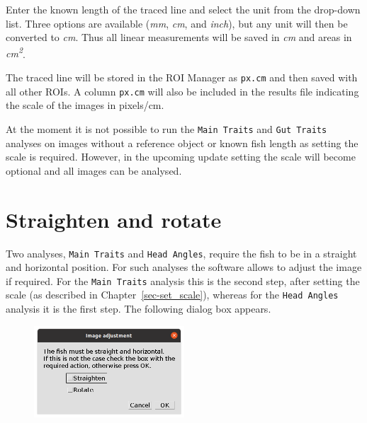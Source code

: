 \documentclass[
  letterpaper,
]{scrbook}
\begin{document}
Enter the known length of the traced line and select the unit from the
drop-down list. Three options are available (\emph{mm}, \emph{cm}, and
\emph{inch}), but any unit will then be converted to \emph{cm}. Thus all
linear measurements will be saved in \emph{cm} and areas in
\emph{cm\textsuperscript{2}}.

The traced line will be stored in the ROI Manager as \texttt{px.cm} and
then saved with all other ROIs. A column \texttt{px.cm} will also be
included in the results file indicating the scale of the images in
pixels/cm.

\begin{tcolorbox}[standard jigsaw,bottomtitle=1mm, toptitle=1mm, colframe=quarto-callout-warning-color-frame, colbacktitle=quarto-callout-warning-color!10!white, title=\textcolor{quarto-callout-warning-color}{\faExclamationTriangle}\hspace{0.5em}{Warning}, titlerule=0mm, opacityback=0, arc=.35mm, opacitybacktitle=0.6, rightrule=.15mm, toprule=.15mm, coltitle=black, left=2mm, colback=white, leftrule=.75mm, bottomrule=.15mm]
At the moment it is not possible to run the \texttt{Main\ Traits} and
\texttt{Gut\ Traits} analyses on images without a reference object or
known fish length as setting the scale is required. However, in the
upcoming update setting the scale will become optional and all images
can be analysed.
\end{tcolorbox}

\hypertarget{sec-straighten_rotate}{%
\chapter{Straighten and rotate}\label{sec-straighten_rotate}}

Two analyses, \texttt{Main\ Traits} and \texttt{Head\ Angles}, require
the fish to be in a straight and horizontal position. For such analyses
the software allows to adjust the image if required. For the
\texttt{Main\ Traits} analysis this is the second step, after setting
the scale (as described in Chapter~\ref{sec-set_scale}), whereas for the
\texttt{Head\ Angles} analysis it is the first step. The following
dialog box appears.

\begin{figure}

{\centering \includegraphics[width=0.5\textwidth,height=\textheight]{./images/screenshots/adjust_image.png}

}

\end{figure}
\end{document}
